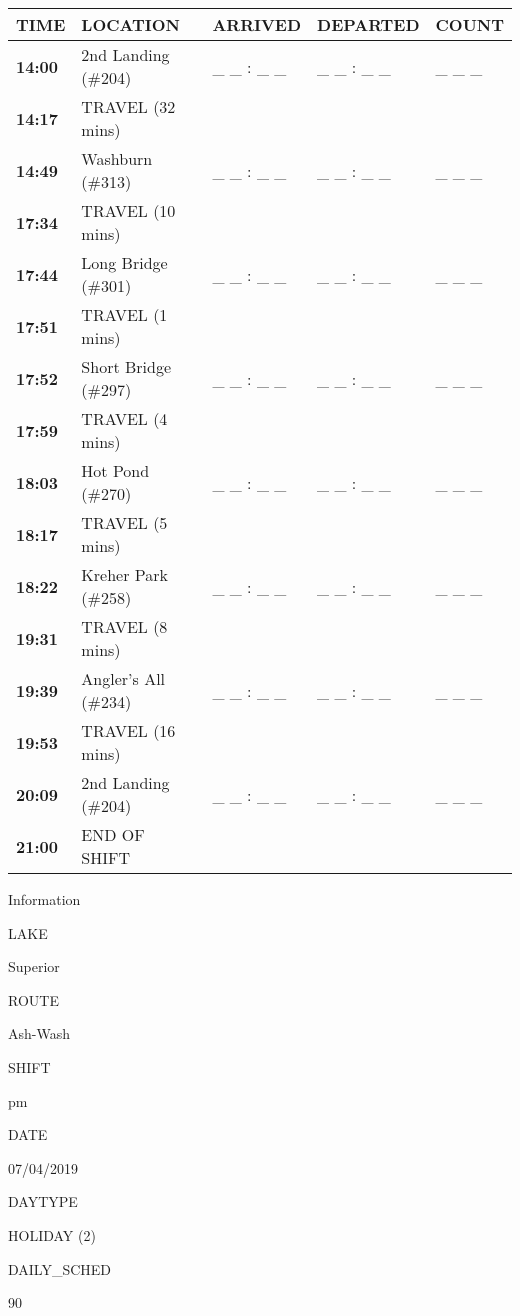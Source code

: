 \documentclass[]{article}
\begin{document}
\begin{tabular}{>{\bfseries}lllll}
\toprule
\textbf{TIME} & \textbf{LOCATION} & \textbf{ARRIVED} & \textbf{DEPARTED} & \textbf{COUNT}\\
\midrule
14:00 & 2nd Landing (\#204) & \_ \_ : \_ \_ & \_ \_ : \_ \_ & \_ \_ \_\\
14:17 & TRAVEL (32 mins) &  &  & \\
14:49 & Washburn (\#313) & \_ \_ : \_ \_ & \_ \_ : \_ \_ & \_ \_ \_\\
17:34 & TRAVEL (10 mins) &  &  & \\
17:44 & Long Bridge (\#301) & \_ \_ : \_ \_ & \_ \_ : \_ \_ & \_ \_ \_\\
17:51 & TRAVEL (1 mins) &  &  & \\
17:52 & Short Bridge (\#297) & \_ \_ : \_ \_ & \_ \_ : \_ \_ & \_ \_ \_\\
17:59 & TRAVEL (4 mins) &  &  & \\
18:03 & Hot Pond (\#270) & \_ \_ : \_ \_ & \_ \_ : \_ \_ & \_ \_ \_\\
18:17 & TRAVEL (5 mins) &  &  & \\
18:22 & Kreher Park (\#258) & \_ \_ : \_ \_ & \_ \_ : \_ \_ & \_ \_ \_\\
19:31 & TRAVEL (8 mins) &  &  & \\
19:39 & Angler's All (\#234) & \_ \_ : \_ \_ & \_ \_ : \_ \_ & \_ \_ \_\\
19:53 & TRAVEL (16 mins) &  &  & \\
20:09 & 2nd Landing (\#204) & \_ \_ : \_ \_ & \_ \_ : \_ \_ & \_ \_ \_\\
21:00 & END OF SHIFT &  &  & \\
\bottomrule
\end{tabular}\newpage

Information

LAKE

Superior

ROUTE

Ash-Wash

SHIFT

pm

DATE

07/04/2019

DAYTYPE

HOLIDAY (2)

DAILY\_SCHED

90

\vspace{24pt}
\end{document}
